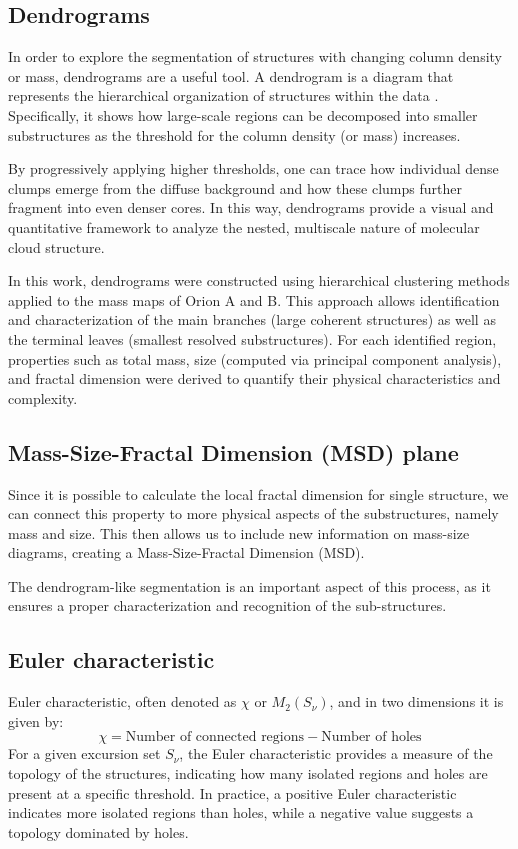 \subsection{Dendrograms}

In order to explore the segmentation of structures with changing column density or mass, dendrograms are a useful tool. A dendrogram is a diagram that represents the hierarchical organization of structures within the data \cite{everitt2010cambridge}. Specifically, it shows how large-scale regions can be decomposed into smaller substructures as the threshold for the column density (or mass) increases.

By progressively applying higher thresholds, one can trace how individual dense clumps emerge from the diffuse background and how these clumps further fragment into even denser cores. In this way, dendrograms provide a visual and quantitative framework to analyze the nested, multiscale nature of molecular cloud structure.

In this work, dendrograms were constructed using hierarchical clustering methods applied to the mass maps of Orion A and B. This approach allows identification and characterization of the main branches (large coherent structures) as well as the terminal leaves (smallest resolved substructures). For each identified region, properties such as total mass, size (computed via principal component analysis), and fractal dimension were derived to quantify their physical characteristics and complexity.

\subsection{Mass-Size-Fractal Dimension (MSD) plane}

Since it is possible to calculate the local fractal dimension for single structure, we can connect this property to more physical aspects of the substructures, namely mass and size. This then allows us to include new information on mass-size diagrams, creating a Mass-Size-Fractal Dimension (MSD).

The dendrogram-like segmentation is an important aspect of this process, as it ensures a proper characterization and recognition of the sub-structures. 

\subsection{Euler characteristic}

Euler characteristic, often denoted as $\chi$ or $M_2(S_{\nu})$, and in two dimensions it is given by:
\begin{equation}
    \chi = \text{Number of connected regions} - \text{Number of holes}
\end{equation}
For a given excursion set $S_{\nu}$, the Euler characteristic provides a measure of the topology of the structures, indicating how many isolated regions and holes are present at a specific threshold. In practice, a positive Euler characteristic indicates more isolated regions than holes, while a negative value suggests a topology dominated by holes.

